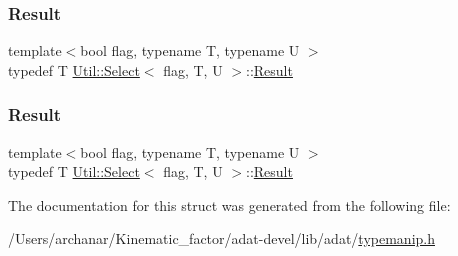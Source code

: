 \subsubsection{\texorpdfstring{Result}{Result}\hspace{0.1cm}{\footnotesize\ttfamily [2/3]}}
{\footnotesize\ttfamily template$<$bool flag, typename T, typename U $>$ \\
typedef T \mbox{\hyperlink{structUtil_1_1Select}{Util\+::\+Select}}$<$ flag, T, U $>$\+::\mbox{\hyperlink{structUtil_1_1Select_a2b5640609685e97b25f3ec1ce967f745}{Result}}}

\mbox{\label{structUtil_1_1Select_a2b5640609685e97b25f3ec1ce967f745}} 
\subsubsection{\texorpdfstring{Result}{Result}\hspace{0.1cm}{\footnotesize\ttfamily [3/3]}}
{\footnotesize\ttfamily template$<$bool flag, typename T, typename U $>$ \\
typedef T \mbox{\hyperlink{structUtil_1_1Select}{Util\+::\+Select}}$<$ flag, T, U $>$\+::\mbox{\hyperlink{structUtil_1_1Select_a2b5640609685e97b25f3ec1ce967f745}{Result}}}



The documentation for this struct was generated from the following file\+:\begin{DoxyCompactItemize}
\item 
/\+Users/archanar/\+Kinematic\+\_\+factor/adat-\/devel/lib/adat/\mbox{\hyperlink{adat-devel_2lib_2adat_2typemanip_8h}{typemanip.\+h}}\end{DoxyCompactItemize}
